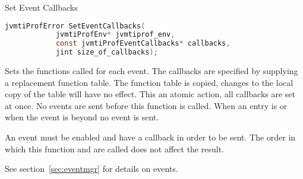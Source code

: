 \begin{apidef}{Set Event Callbacks}
\begin{lstlisting}[language=C]
jvmtiProfError SetEventCallbacks(
            jvmtiProfEnv* jvmtiprof_env,
            const jvmtiProfEventCallbacks* callbacks,
            jint size_of_callbacks);
\end{lstlisting}

\begin{apidesc}
Sets the functions called for each event. The callbacks are specified by supplying a replacement function table. The function table is copied, changes to the local copy of the table will have no effect. This an atomic action, all callbacks are set at once.  No events are sent before this function is called. When an entry is  or when the event is beyond  no event is sent.

An event must be enabled and have a callback in order to be sent. The order in which this function and  are called does not affect the result. 

See section~\ref{sec:eventmgr} for details on events.

\end{apidesc}

\begin{apiphase}
\apiphaseonloadlive
\end{apiphase}

\begin{apicap}
\apicaprequired
\end{apicap}

\begin{apiparam}
\end{apiparam}

\apireturnempty

\begin{apierror}
\end{apierror}
\end{apidef}
